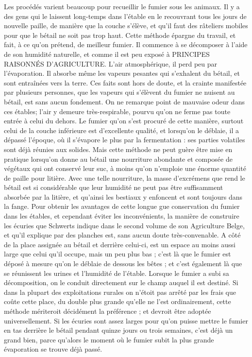 Les procédés varient beaucoup pour recueillir le fumier sous les animaux. Il y a des gens qui le laissent long-temps dans l’étable en le recouvrant tous les jours de nouvelle paille, de manière que la couche s’élève, et qu’il faut des râteliers mobiles pour que le bétail ne soit pas trop haut. Cette méthode épargne du travail, et fait, à ce qu’on prétend, de meilleur fumier. Il commence à se décomposer à l’aide de son humidité naturelle, et comme il est peu exposé à\setcounter{page}{299} PRINCIPES RAISONNÉS D'AGRICULTURE. L'air atmosphérique, il perd peu par l'évaporation. Il absorbe même les vapeurs pesantes qui s'exhalent du bétail, et sont entraînées vers la terre. Ces faits sont hors de doute, et la crainte manifestée par plusieurs personnes, que les vapeurs qui s'élèvent du fumier ne nuisent au bétail, est sans aucun fondement. On ne remarque point de mauvaise odeur dans ces étables; l'air y demeure très-respirable, pourvu qu'on ne ferme pas toute entrée à celui du dehors. Le fumier qu'on s'est procuré de cette manière, surtout celui de la couche inférieure est d'excellente qualité, et lorsqu'on le déblaie, il a dépassé l'époque, où il s'évapore le plus par la fermentation : ses parties volatiles sont déjà réunies aux solides.
Mais cette méthode ne peut guère être mise en pratique lorsqu'on donne au bétail une nourriture abondante et composée de végétaux qui ont conservé leur suc, à moins qu'on n'emploie une énorme quantité de paille pour litière. Avec une telle nourriture, la masse d'excrémens que rend le bétail est si considérable que leur humidité ne peut pas être suffisamment absorbée par la litière, et qu'ainsi les bestiaux y enfoncent et sont toujours dans la fange.
Pour obtenir les avantages de cette longue\setcounter{page}{300} gue conservation du fumier dans les étables, et cependant éviter les inconvénients, la manière de construire les écuries que Schwerts indique dans le second volume de son Agriculture Belge, et qu'il explique par des planches est, sans aucun doute très-convenable. A côté de la place assignée au bétail et derrière celui-ci, est un espace au moins aussi large que celui qu'il occupe, mais un peu plus bas ; c'est là que le fumier est déposé à mesure qu'on le déblaie de dessous les bêtes ; et c'est également là que se réunissent les urines et l'humidité de l'étable. Lorsque le fumier a subi sa décomposition, on le conduit directement sur le champ auquel il est destiné.
Si dans la plupart des exploitations rurales on n'étoit pas arrêté par les frais que coûte cette place, du double plus grande qu'elle ne l'est ordinairement, cette méthode mériteroit décidément la préférence ; et devroit être adoptée universellement. Si les écuries sont assez larges pour qu'on puisse mettre le fumier en tas derrière le bétail pendant quinze jours ou trois semaines, c'est déjà un grand bien, parce qu'alors le moment où le fumier subit la plus grande évaporation se trouve déjà passé.
